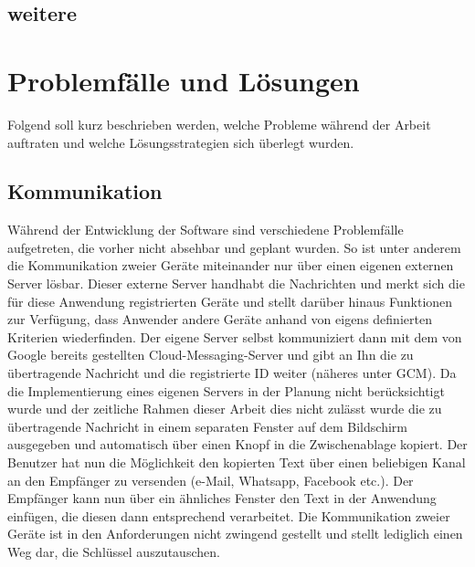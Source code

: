 \documentclass[10pt, a4paper]{scrreprt}
\begin{document}
\section{weitere}

\chapter{Problemfälle und Lösungen}
Folgend soll kurz beschrieben werden, welche Probleme während der Arbeit auftraten und welche Lösungsstrategien sich überlegt wurden.


\section{Kommunikation}
Während der Entwicklung der Software sind verschiedene Problemfälle aufgetreten, die vorher nicht absehbar und geplant wurden. So ist unter anderem die Kommunikation zweier Geräte miteinander nur über einen eigenen externen Server lösbar. Dieser externe Server handhabt die Nachrichten und merkt sich die für diese Anwendung registrierten Geräte und stellt darüber hinaus Funktionen zur Verfügung, dass Anwender andere Geräte anhand von eigens definierten Kriterien wiederfinden. Der eigene Server selbst kommuniziert dann mit dem von Google bereits gestellten Cloud-Messaging-Server und gibt an Ihn die zu übertragende Nachricht und die registrierte ID weiter (näheres unter GCM). Da die Implementierung eines eigenen Servers in der Planung nicht berücksichtigt wurde und der zeitliche Rahmen dieser Arbeit dies nicht zulässt wurde die zu übertragende Nachricht in einem separaten Fenster auf dem Bildschirm ausgegeben und automatisch über einen Knopf in die Zwischenablage kopiert. Der Benutzer hat nun die Möglichkeit den kopierten Text über einen beliebigen Kanal an den Empfänger zu versenden (e-Mail, Whatsapp, Facebook etc.). Der Empfänger kann nun über ein ähnliches Fenster den Text in der Anwendung einfügen, die diesen dann entsprechend verarbeitet. Die Kommunikation zweier Geräte ist in den Anforderungen nicht zwingend gestellt und stellt lediglich einen Weg dar, die Schlüssel auszutauschen. 
\end{document}
